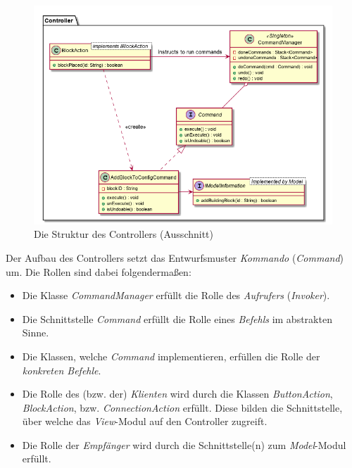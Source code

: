 \documentclass[parskip=full]{scrartcl}
\begin{document}
\begin{figure}[htbp]
	\begin{center}
		\includegraphics[width = 14cm]{Grafiken/Controller_Struktur.png}
		\caption{Die Struktur des Controllers (Ausschnitt)}
		\label{Controller_Struktur}
	\end{center}
\end{figure}

Der Aufbau des Controllers setzt das Entwurfsmuster \textit{Kommando} (\textit{Command}) um. Die Rollen sind dabei folgendermaßen:

\begin{itemize}

\item Die Klasse \textit{CommandManager} erfüllt die Rolle des \textit{Aufrufers} (\textit{Invoker}).
\item Die Schnittstelle \textit{Command} erfüllt die Rolle eines \textit{Befehls} im abstrakten Sinne.
\item Die Klassen, welche \textit{Command} implementieren, erfüllen die Rolle der \textit{konkreten Befehle}.
\item Die Rolle des (bzw. der) \textit{Klienten} wird durch die Klassen \textit{ButtonAction}, \textit{BlockAction}, bzw. \textit{ConnectionAction} erfüllt. Diese bilden die Schnittstelle, über welche das \textit{View}-Modul auf den Controller zugreift.
\item Die Rolle der \textit{Empfänger} wird durch die Schnittstelle(n) zum \textit{Model}-Modul erfüllt.

\end{itemize}
\end{document}
